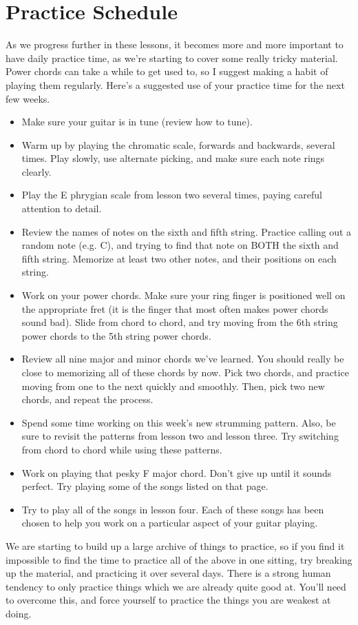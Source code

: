 \section{Practice Schedule}
As we progress further in these lessons, it becomes more and more important to have daily practice time, as we're starting to cover some really tricky material. Power chords can take a while to get used to, so I suggest making a habit of playing them regularly. Here's a suggested use of your practice time for the next few weeks.
%
\begin{itemize}
\item Make sure your guitar is in tune (review how to tune).
\item Warm up by playing the chromatic scale, forwards and backwards, several times. Play slowly, use alternate picking, and make sure each note rings clearly.
\item Play the E phrygian scale from lesson two several times, paying careful attention to detail.
\item Review the names of notes on the sixth and fifth string. Practice calling out a random note (e.g. C), and trying to find that note on BOTH the sixth and fifth string. Memorize at least two other notes, and their positions on each string.
\item Work on your power chords. Make sure your ring finger is positioned well on the appropriate fret (it is the finger that most often makes power chords sound bad). Slide from chord to chord, and try moving from the 6th string power chords to the 5th string power chords.
\item Review all nine major and minor chords we've learned. You should really be close to memorizing all of these chords by now. Pick two chords, and practice moving from one to the next quickly and smoothly. Then, pick two new chords, and repeat the process.
\item Spend some time working on this week's new strumming pattern. Also, be sure to revisit the patterns from lesson two and lesson three. Try switching from chord to chord while using these patterns.
\item Work on playing that pesky F major chord. Don't give up until it sounds perfect. Try playing some of the songs listed on that page.
\item Try to play all of the songs in lesson four. Each of these songs has been chosen to help you work on a particular aspect of your guitar playing.
\end{itemize}
%
We are starting to build up a large archive of things to practice, so if you find it impossible to find the time to practice all of the above in one sitting, try breaking up the material, and practicing it over several days. There is a strong human tendency to only practice things which we are already quite good at. You'll need to overcome this, and force yourself to practice the things you are weakest at doing.

